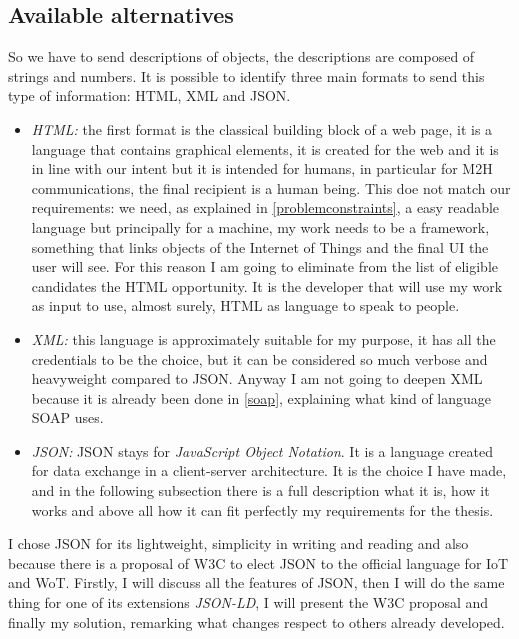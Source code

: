 \subsection{Available alternatives}
So we have to send descriptions of objects, the descriptions are composed of strings and numbers. It is possible to identify three main formats to send this type of information: HTML, XML and JSON. 
\begin{itemize}

	\item \textit{HTML:} the first format is the classical building block of a web page, it is a language that contains graphical elements, it is created for the web and it is in line with our intent but it is intended for humans, in particular for M2H communications, the final recipient is a human being. This doe not match our requirements: we need, as explained in \ref{problemconstraints}, a easy readable language but principally for a machine, my work needs to be a framework, something that links objects of the Internet of Things and the final UI the user will see. For this reason I am going to eliminate from the list of eligible candidates the HTML opportunity. It is the developer that will use my work as input to use, almost surely, HTML as language to speak to people.
	
	\item \textit{XML:} this language is approximately suitable for my purpose, it has all the credentials to be the choice, but it can be considered so much verbose and heavyweight compared to JSON. Anyway I am not going to deepen XML because it is already been done in \ref{soap}, explaining what kind of language SOAP uses.
	
	\item \textit{JSON:} JSON stays for \textit{JavaScript Object Notation}. It is a language created for data exchange in a client-server architecture. It is the choice I have made, and in the following subsection there is a full description what it is, how it works and above all how it can fit perfectly my requirements for the thesis.

\end{itemize}

I chose JSON for its lightweight, simplicity in writing and reading and also because there is a proposal of W3C to elect JSON to the official language for IoT and WoT. Firstly, I will discuss all the features of JSON, then I will do the same thing for one of its extensions \textit{JSON-LD}, I will present the W3C proposal and finally my solution, remarking what changes respect to others already developed.

